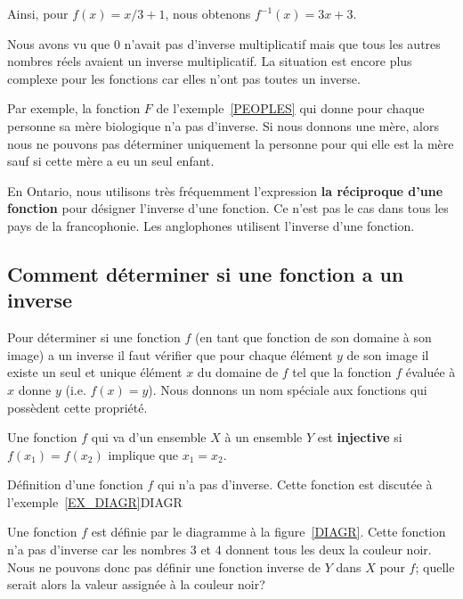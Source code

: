 {\begin{egg}
Ainsi, pour $f(x) = x/3 + 1$, nous obtenons $f^{-1}(x) = 3x + 3$.
\end{egg}

Nous avons vu que $0$ n'avait pas d'inverse multiplicatif mais que tous les
autres nombres réels avaient un inverse multiplicatif.  La situation
est encore plus complexe pour les fonctions car elles n'ont pas toutes
un inverse.

\begin{egg}
Par exemple, la fonction $F$ de l'exemple~\ref{PEOPLES} qui donne pour
chaque personne sa mère biologique n'a pas d'inverse.  Si nous donnons une
mère, alors nous ne pouvons pas déterminer uniquement la personne pour qui
elle est la mère sauf si cette mère a eu un seul enfant.
\end{egg}

\begin{rmk}
En Ontario, nous utilisons très fréquemment l'expression
{\bfseries la réciproque d'une fonction} pour désigner l'inverse
d'une fonction.  Ce n'est pas le cas dans tous les pays de la
francophonie.  Les anglophones utilisent l'inverse d'une fonction. 
\end{rmk}

\subsection{Comment déterminer si une fonction a un inverse}

Pour déterminer si une fonction $f$ (en tant que fonction de son
domaine à son image) a un inverse il faut vérifier que pour chaque
élément $y$ de son image il existe un seul et unique élément $x$ du
domaine de $f$ tel que la fonction $f$ évaluée à $x$ donne $y$
(i.e. $f(x)=y$).  Nous donnons un nom spéciale aux fonctions qui
possèdent cette propriété.

\begin{defn} 
Une fonction $f$ qui va d'un ensemble $X$ à un ensemble $Y$ est
{\bfseries injective} si $f(x_1) = f(x_2)$
implique que $x_1 = x_2$.
\end{defn}

{Définition d'une fonction $f$ qui n'a pas d'inverse.  Cette fonction
est discutée à l'exemple~\ref{EX_DIAGR}}{DIAGR}

\begin{egg}
Une fonction $f$ est définie par le diagramme à la
figure~\ref{DIAGR}.  Cette fonction n'a pas d'inverse car les nombres
$3$ et $4$ donnent tous les deux la couleur noir.  Nous ne pouvons
donc pas définir une fonction inverse de $Y$ dans $X$ pour $f$; quelle
serait alors la valeur assignée à la couleur noir?
\label{EX_DIAGR}
\end{egg}

}
